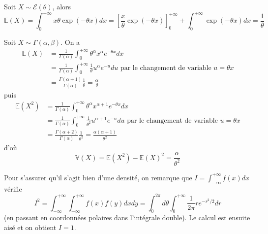 \label{II-answer-moments-expo}
Soit \(X \sim \mathcal{E}(\theta)\), alors
\[\mathbb{E}(X) = \int_0^{+\infty} x \theta \exp(-\theta x) dx = [\frac{x}{\theta}\exp(-\theta x)]_0^{+\infty} + \int_0^{+\infty} \exp(-\theta x) dx = \frac{1}{\theta}\]

\label{II-answer-moments-gamma}
Soit \(X\sim \Gamma(\alpha,\beta)\). On a \begin{align*}
\mathbb{E}(X) &= \frac{1}{\Gamma(\alpha)}\int_0^{+\infty} \theta^\alpha x^\alpha e^{-\theta x} dx\\
        &= \frac{1}{\Gamma(\alpha)}\int_0^{+\infty} \frac{1}{\theta} u^\alpha e^{-u} du \text{ par le changement de variable } u = \theta x\\
        &= \frac{\Gamma(\alpha+1)}{\Gamma(\alpha)} \frac{1}{\theta} = \frac{\alpha}{\theta}
\end{align*} puis \begin{align*}
\mathbb{E}(X^2) &= \frac{1}{\Gamma(\alpha)}\int_0^{+\infty} \theta^\alpha x^{\alpha+1} e^{-\theta x} dx\\
        &= \frac{1}{\Gamma(\alpha)}\int_0^{+\infty} \frac{1}{\theta^2} u^{\alpha+1} e^{-u} du \text{ par le changement de variable } u = \theta x\\
        &= \frac{\Gamma(\alpha+2)}{\Gamma(\alpha)} \frac{1}{\theta^2} = \frac{\alpha(\alpha+1)}{\theta^2}
\end{align*} d'où
\[\mathbb{V}(X) = \mathbb{E}(X^2) - \mathbb{E}(X)^2 = \frac{\alpha}{\theta^2}\]

\label{II-answer-moments-gauss}
Pour s'assurer qu'il s'agit bien d'une densité, on remarque que
\(I = \int_{-\infty}^{+\infty} f(x) dx\) vérifie
\[ I^2 = \int_{-\infty}^{+\infty} \int_{-\infty}^{+\infty} f(x) f(y) dxdy = \int_{0}^{2\pi} d\theta\int_{0}^{+\infty}\frac{1}{2\pi} r e^{-r^2/2}dr \]
(en passant en coordonnées polaires dans l'intégrale double). Le calcul
est ensuite aisé et on obtient \(I = 1\).

